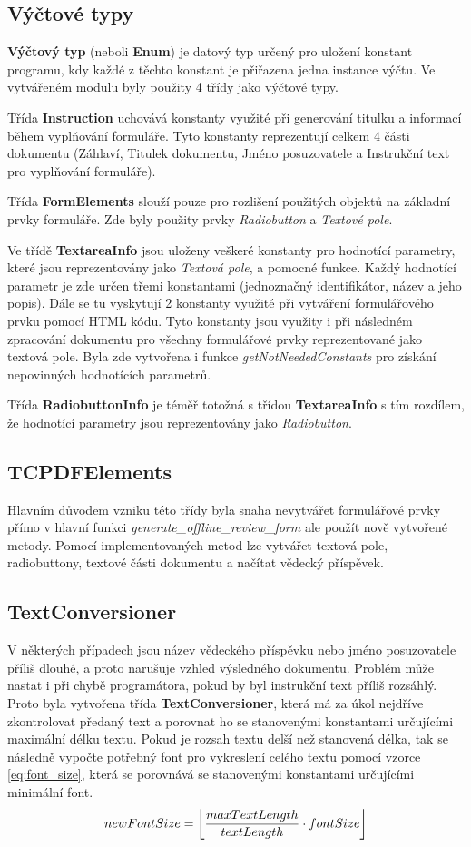 \subsection{Výčtové typy}
\textbf{Výčtový typ} (neboli \textbf{Enum}) je datový typ určený pro uložení konstant programu, kdy každé z těchto konstant je přiřazena jedna instance výčtu. Ve vytvářeném modulu byly použity 4 třídy jako výčtové typy. 
\par
Třída \textbf{Instruction} uchovává konstanty využité při generování titulku a informací během vyplňování formuláře. Tyto konstanty reprezentují celkem 4 části dokumentu (Záhlaví, Titulek dokumentu, Jméno posuzovatele a Instrukční text pro vyplňování formuláře).
\par
Třída \textbf{FormElements} slouží pouze pro rozlišení použitých objektů na základní prvky formuláře. Zde byly použity prvky \textit{Radiobutton} a \textit{Textové pole}.
\par
Ve třídě \textbf{TextareaInfo} jsou uloženy veškeré konstanty pro hodnotící parametry, které jsou reprezentovány jako \textit{Textová pole}, a pomocné funkce. Každý hodnotící parametr je zde určen třemi konstantami (jednoznačný identifikátor, název a jeho popis). Dále se tu vyskytují 2 konstanty využité při vytváření formulářového prvku pomocí HTML kódu. Tyto konstanty jsou využity i při následném zpracování dokumentu pro všechny formulářové prvky reprezentované jako textová pole. Byla zde vytvořena i funkce \textit{getNotNeededConstants} pro získání nepovinných hodnotících parametrů.
\par
Třída \textbf{RadiobuttonInfo} je téměř totožná s třídou \textbf{TextareaInfo} s tím rozdílem, že hodnotící parametry jsou reprezentovány jako \textit{Radiobutton}.
\subsection{TCPDFElements}
Hlavním důvodem vzniku této třídy byla snaha nevytvářet formulářové prvky přímo v hlavní funkci \textit{generate\_offline\_review\_form} ale použít nově vytvořené metody. Pomocí implementovaných metod lze vytvářet textová pole, radiobuttony, textové části dokumentu a načítat vědecký příspěvek.
\subsection{TextConversioner}
V některých případech jsou název vědeckého příspěvku nebo jméno posuzovatele příliš dlouhé, a proto narušuje vzhled výsledného dokumentu. Problém může nastat i při chybě programátora, pokud by byl instrukční text příliš rozsáhlý. Proto byla vytvořena třída \textbf{TextConversioner}, která má za úkol nejdříve zkontrolovat předaný text a porovnat ho se stanovenými konstantami určujícími maximální délku textu. Pokud je rozsah textu delší než stanovená délka, tak se následně vypočte potřebný font pro vykreslení celého textu pomocí vzorce \eqref{eq:font_size}, která se porovnává se stanovenými konstantami určujícími minimální font. 
\begin{equation}
newFontSize = \floor*{\frac{maxTextLength}{textLength} \cdot fontSize} \label{eq:font_size}
\end{equation}

